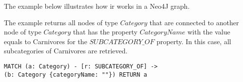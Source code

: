 The example below illustrates how \gls{ir} works in a Neo4J graph.

The example returns all nodes of type $Category$  that are connected to another node of type $Category$ that has the property $CategoryName$ with the value equals to Carnivores for the $SUBCATEGORY\_OF$ property. In this case, all subcategories of Carnivores are retrieved.

\begin{verbatim}
MATCH (a: Category) - [r: SUBCATEGORY_OF] ->
(b: Category {categoryName: ""}) RETURN a
\end{verbatim}


